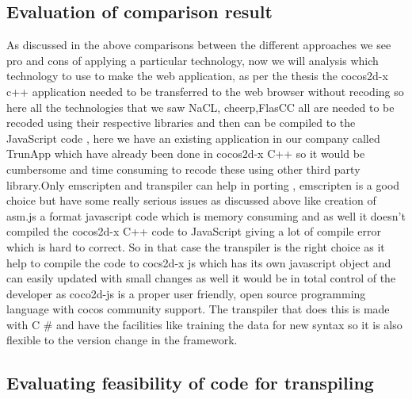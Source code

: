 \documentclass[23pt]{article}
\begin{document}
\subsection{Evaluation of comparison result }

{\Large As discussed in the above comparisons between the different approaches we see pro and cons of applying a particular technology, now we will analysis which technology to use to make the web application, as per the thesis the cocos2d-x c++ application needed to be transferred to the web browser without recoding so here all the technologies that we saw NaCL, cheerp,FlasCC all are needed to be recoded using their respective libraries and then can be compiled to the JavaScript code , here we have an existing application in our company called TrunApp which have already been done in cocos2d-x C++ so it would be cumbersome and time consuming to recode these using other third party library.Only emscripten and transpiler can help in porting , emscripten is a good choice but have some really serious issues as discussed above like creation of asm.js a format javascript code which is memory consuming and as well it doesn’t compiled the cocos2d-x C++ code to JavaScript giving a lot of compile error which is hard to correct. So in that case the transpiler is the right choice as it help to compile the code to cocs2d-x js which has its own javascript object and can easily updated with small changes as well it would be in total control of the developer as coco2d-js is a proper user friendly, open source programming language with cocos community support. The transpiler that does this is made with C \# and have the facilities like training the data for new syntax so it is also flexible to the version change in the framework. \\ \par}


\subsection{Evaluating feasibility of code for transpiling}
\end{document}
